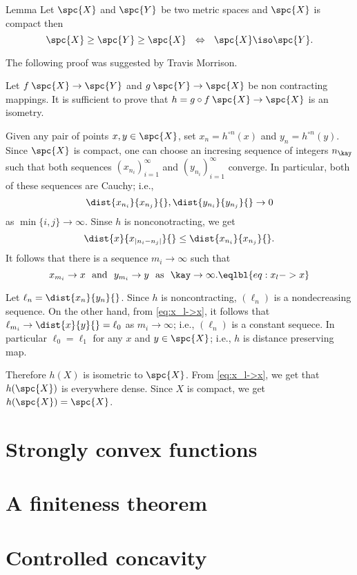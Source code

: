 \begin{thm}{Lemma}\label{lem:>=-isometry}
Let $\spc{X}$ and $\spc{Y}$ be two metric spaces 
and $\spc{X}$ is compact then
\[
\spc{X}\ge\spc{Y}\ge\spc{X}
\ \ \Leftrightarrow\ \ 
\spc{X}\iso\spc{Y}.
\]

\end{thm}

The following proof was suggested by Travis Morrison.

Let $f\: \spc{X} \to \spc{Y}$ 
and $g\: \spc{Y} \to \spc{X}$ be non contracting mappings.
It is sufficient to prove that $h  = g\circ f\:\spc{X}\to \spc{X}$ is an isometry. 

Given any pair of points $x,y\in \spc{X}$, 
set $x_n=h^{\circ n}(x)$ and $y_n=h^{\circ n}(y)$.
Since $\spc{X}$ is compact, one can choose an incresing sequence of integers $n_\kay$
such that both sequences $(x_{n_i})_{i=1}^\infty$ and $(y_{n_i})_{i=1}^\infty$
converge.
In particular, both of these sequences  are Cauchy;
i.e.,
\[
\dist{x_{n_i}}{x_{n_j}}{},\dist{y_{n_i}}{y_{n_j}}{}\to 0
\]
as $\min\{i,j\}\to\infty$.
Sinse $h$ is nonconotracting, we get
\[
\dist{x}{x_{|n_i-n_j|}}{}\le \dist{x_{n_i}}{x_{n_j}}{}.
\]
It follows that  
there is a sequence $m_i\to\infty$ such that
\[
x_{m_i}\to x\ \ \text{and}\ \ y_{m_i}\to y\ \ \text{as}\ \ \kay\to\infty.
\eqlbl{eq:x_l->x}
\]

Let $\ell_n=\dist{x_n}{y_n}{}$.
Since $h$ is noncontracting, $(\ell_n)$ is a nondecreasing sequence.
On the other hand, 
from \ref{eq:x_l->x}, it follows that $\ell_{m_i}\to\dist{x}{y}{}=\ell_0$ as $m_i\to\infty$;
i.e., $(\ell_n)$ is a constant sequece.
In particular $\ell_0=\ell_1$ for any $x$ and $y\in \spc{X}$;
i.e., $h$ is distance preserving map.

Therefore $h(X)$ is isometric to $\spc{X}$.
From \ref{eq:x_l->x}, we get that $h(\spc{X})$ is everywhere dense.
Since $X$ is compact, we get $h(\spc{X})=\spc{X}$.
\qeds

\section{Strongly convex functions}

\section{A finiteness theorem}

\section{Controlled concavity}
\addtocounter{subsection}{1}
\setcounter{thm}{0}

